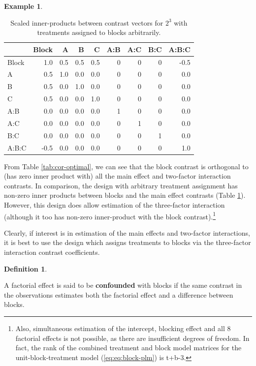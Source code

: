 \documentclass[
]{book}
\theoremstyle{definition}
\newtheorem{definition}{Definition}[chapter]
\theoremstyle{definition}
\newtheorem{example}{Example}[chapter]
\theoremstyle{definition}
\theoremstyle{definition}
\theoremstyle{remark}
\begin{document}
\begin{example}
\begin{table}
\caption{\label{tab:cor-partial}Scaled inner-products between contrast vectors for $2^3$ with treatments assigned to blocks arbitrarily.}
\centering
\begin{tabular}[t]{l|r|r|r|r|r|r|r|r}
\hline
  & Block & A & B & C & A:B & A:C & B:C & A:B:C\\
\hline
Block & 1.0 & 0.5 & 0.5 & 0.5 & 0 & 0 & 0 & -0.5\\
\hline
A & 0.5 & 1.0 & 0.0 & 0.0 & 0 & 0 & 0 & 0.0\\
\hline
B & 0.5 & 0.0 & 1.0 & 0.0 & 0 & 0 & 0 & 0.0\\
\hline
C & 0.5 & 0.0 & 0.0 & 1.0 & 0 & 0 & 0 & 0.0\\
\hline
A:B & 0.0 & 0.0 & 0.0 & 0.0 & 1 & 0 & 0 & 0.0\\
\hline
A:C & 0.0 & 0.0 & 0.0 & 0.0 & 0 & 1 & 0 & 0.0\\
\hline
B:C & 0.0 & 0.0 & 0.0 & 0.0 & 0 & 0 & 1 & 0.0\\
\hline
A:B:C & -0.5 & 0.0 & 0.0 & 0.0 & 0 & 0 & 0 & 1.0\\
\hline
\end{tabular}
\end{table}

From Table \ref{tab:cor-optimal}, we can see that the block contrast is orthogonal to (has zero inner product with) all the main effect and two-factor interaction contrasts. In comparison, the design with arbitrary treatment assignment has non-zero inner products between blocks and the main effect contrasts (Table \ref{tab:cor-partial}). However, this design does allow estimation of the three-factor interaction (although it too has non-zero inner-product with the block contrast).\footnote{Also, simultaneous estimation of the intercept, blocking effect and all 8 factorial effects is not possible, as there are insufficient degrees of freedom. In fact, the rank of the combined treatment and block model matrices for the unit-block-treatment model (\eqref{eq:eq:block-plm}) is t+b-3.}

Clearly, if interest is in estimation of the main effects and two-factor interactions, it is best to use the design which assigns treatments to blocks via the three-factor interaction contrast coefficients.

\end{example}

\begin{definition}
\protect\hypertarget{def:confounding}{}\label{def:confounding}

A factorial effect is said to be \textbf{confounded} with blocks if the same contrast in the observations estimates both the factorial effect and a difference between blocks.

\end{definition}
\end{document}

